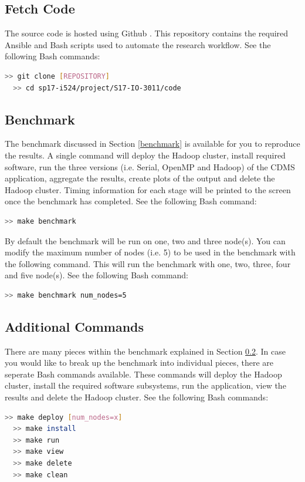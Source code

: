 \documentclass[9pt,twocolumn,twoside]{../../styles/osajnl}
\begin{document}
\subsection{Fetch Code} \label{git}
The source code is hosted using Github \cite{i524-github}. This
repository contains the required Ansible and Bash scripts used to
automate the research workflow.
\noindent See the following Bash commands:
\begin{lstlisting}[language=bash]
  >> git clone [REPOSITORY]
  >> cd sp17-i524/project/S17-IO-3011/code
\end{lstlisting}
\subsection{Benchmark} \label{benchmark-info}
The benchmark discussed in Section \ref{benchmark} is available for
you to reproduce the results. A single command will deploy the Hadoop
cluster, install required software, run the three versions
(i.e. Serial, OpenMP and Hadoop) of the CDMS application, aggregate
the results, create plots of the output and delete the Hadoop
cluster. Timing information for each stage will be printed to the
screen once the benchmark has completed.
\noindent See the following Bash command:
\begin{lstlisting}[language=bash]
  >> make benchmark
\end{lstlisting}
By default the benchmark will be run on one, two and three
node(s). You can modify the maximum number of nodes (i.e. 5) to be
used in the benchmark with the following command. This will run the
benchmark with one, two, three, four and five node(s).
\noindent See the following Bash command:
\begin{lstlisting}[language=bash]
  >> make benchmark num_nodes=5
\end{lstlisting}
\subsection{Additional Commands} \label{other}
There are many pieces within the benchmark explained in Section
\ref{benchmark-info}. In case you would like to break up the benchmark
into individual pieces, there are seperate Bash commands
available. These commands will deploy the Hadoop cluster, install the
required software subsystems, run the application, view the results
and delete the Hadoop cluster.
\noindent See the following Bash commands:
\begin{lstlisting}[language=bash]
  >> make deploy [num_nodes=x]
  >> make install
  >> make run
  >> make view
  >> make delete
  >> make clean
\end{lstlisting}
\end{document}
